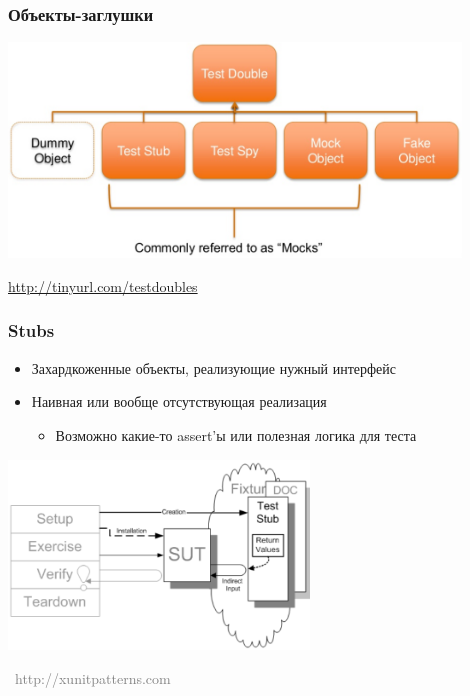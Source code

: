 \documentclass[xetex,mathserif,serif]{beamer}
\newcommand{\attribution}[1] {
\vspace{-5mm}\begin{flushright}\begin{scriptsize}\textcolor{gray}{\textcopyright\, #1}\end{scriptsize}\end{flushright}
}
\begin{document}
	\begin{frame}
		\frametitle{Объекты-заглушки}
		\begin{center}
			\includegraphics[width=0.9\textwidth]{testDoubles.png}
		\end{center}
		\url{http://tinyurl.com/testdoubles}
	\end{frame}

	\begin{frame}
		\frametitle{Stubs}
		\begin{itemize}
			\item Захардкоженные объекты, реализующие нужный интерфейс
			\item Наивная или вообще отсутствующая реализация
			\begin{itemize}
				\item Возможно какие-то assert’ы или полезная логика для теста
			\end{itemize}
		\end{itemize}
		\begin{center}
			\includegraphics[width=0.6\textwidth]{stub.png}
			\attribution{http://xunitpatterns.com}
		\end{center}
	\end{frame}
\end{document}
